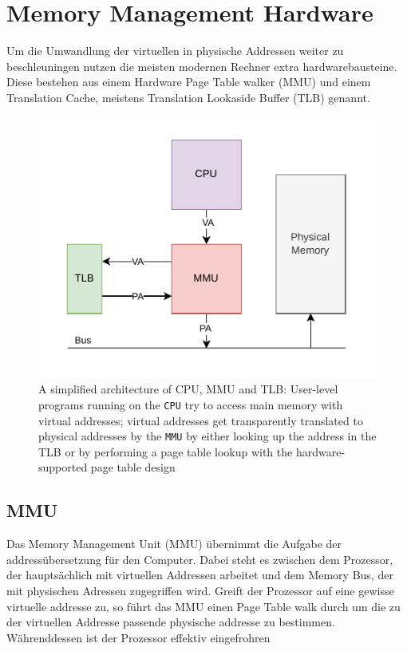 \section{Memory Management Hardware}
Um die Umwandlung der virtuellen in physische Addressen weiter zu beschleuningen nutzen die meisten
modernen Rechner extra hardwarebausteine. Diese bestehen aus einem Hardware Page Table walker (MMU) und
einem Translation Cache, meistens Translation Lookaside Buffer (TLB) genannt\cite{jacobVirtualMemoryContemporary1998}.
\begin{figure}[t]
    \centering
    \includegraphics[scale=1.2]{figures/simple_mmu_arch.pdf}
    \caption[A simplified architecture of CPU, MMU and TLB]{A simplified architecture of CPU, MMU and TLB:
        User-level programs running on the \texttt{CPU} try to access main memory with virtual
        addresses; virtual addresses get transparently translated to physical addresses by the
        \texttt{MMU} by either looking up the address in the TLB or by performing a page table
        lookup with the hardware-supported page table design}
    \label{fig:fund:simplearch}
\end{figure}


\subsection{MMU}
Das Memory Management Unit (MMU) übernimmt die Aufgabe der addressübersetzung für den Computer.
Dabei steht es zwischen dem Prozessor, der hauptsächlich mit virtuellen Addressen arbeitet und dem
Memory Bus, der mit physischen Adressen zugegriffen wird. Greift der Prozessor auf eine gewisse
virtuelle addresse zu, so führt das MMU einen Page Table walk durch um die zu der virtuellen
Addresse passende physische addresse zu bestimmen. Währenddessen ist der Prozessor effektiv eingefrohren\cite{jacobVirtualMemoryContemporary1998}
